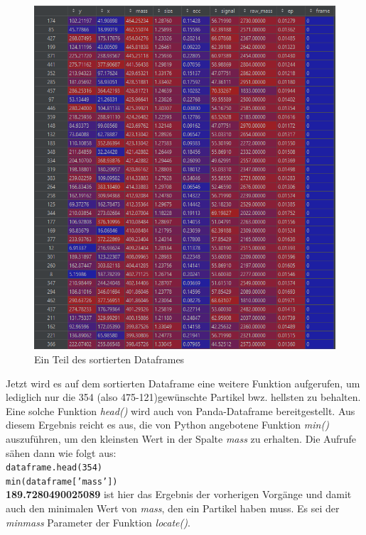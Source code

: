 \begin{enumerate}
\begin{figure}[H]
    \centering
    \includegraphics[scale=0.35]{Grafiken/trackpyBilder/df_sorted.png}
    \caption{Ein Teil des sortierten Dataframes}
\end{figure}

Jetzt wird es auf dem sortierten Dataframe eine weitere Funktion aufgerufen, um lediglich nur die 354 (also 475-121)gewünschte Partikel bwz. hellsten zu behalten. Eine solche Funktion \textit{head()} wird auch von Panda-Dataframe bereitgestellt. Aus diesem Ergebnis reicht es aus, die von Python angebotene Funktion \textit{min()} auszuführen, um den kleinsten Wert in der Spalte \textit{mass} zu erhalten. 
Die Aufrufe sähen dann wie folgt aus:\\
\texttt{dataframe.head(354)} \\
\texttt{min(dataframe['mass'])}\\

\textbf{189.7280490025089} ist hier das Ergebnis der vorherigen Vorgänge und damit auch den minimalen Wert von \textit{mass}, den ein Partikel haben muss. Es sei der \textit{minmass} Parameter der Funktion \textit{locate()}.




\end{enumerate}
